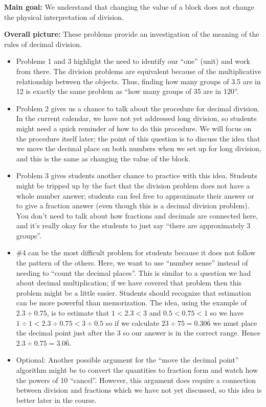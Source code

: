 \documentclass{ximera}
\begin{document}
\newpage
\begin{instructorNotes}

{\bf Main goal:} We understand that changing the value of a block does not change the physical interpretation of division.

{\bf Overall picture:}
These problems provide an investigation of the meaning of the rules of decimal division.

\begin{itemize}
	\item Problems 1 and 3 highlight the need to identify our ``one'' (unit) and work from there.  The division problems are equivalent because of the multiplicative relationship between the objects.  Thus, finding how many groups of 3.5 are in 12 is exactly the same problem as ``how many groups of 35 are in 120''.
	\item Problem 2 gives us a chance to talk about the procedure for decimal division. In the current calendar, we have not yet addressed long division, so students might need a quick reminder of how to do this procedure. We will focus on the procedure itself later; the point of this question is to discuss the idea that we move the decimal place on both numbers when we set up for long division, and this is the same as changing the value of the block.
	\item Problem 3 gives students another chance to practice with this idea. Students might be tripped up by the fact that the division problem does not have a whole number answer; students can feel free to approximate their answer or to give a fraction answer (even though this is a decimal division problem). You don't need to talk about how fractions and decimals are connected here, and it's really okay for the students to just say ``there are approximately 3 groups''.
	\item \#4 can be the most difficult problem for students because it does not follow the pattern of the others. Here, we want to use ``number sense'' instead of needing to ``count the decimal places''.  This is similar to a question we had about decimal multiplication; if we have covered that problem then this problem might be a little easier.  Students should recognize that estimation can be more powerful than memorization. The idea, using the example of $2.3 \div 0.75$, is to estimate that $1 < 2.3 < 3$ and $0.5 < 0.75 < 1$ so we have $1 \div 1 < 2.3 \div 0.75 < 3 \div 0.5$ so if we calculate $23 \div 75 = 0.30\overline{6}$ we must place the decimal point just after the $3$ so our answer is in the correct range. Hence $2.3 \div 0.75 = 3.0\overline{6}$.
	\item Optional: Another possible argument for the ``move the decimal point'' algorithm might be to convert the quantities to fraction form and watch how the powers of 10 ``cancel''. However, this argument does require a connection between division and fractions which we have not yet discussed, so this idea is better later in the course.
\end{itemize}


\end{instructorNotes}
\end{document}
